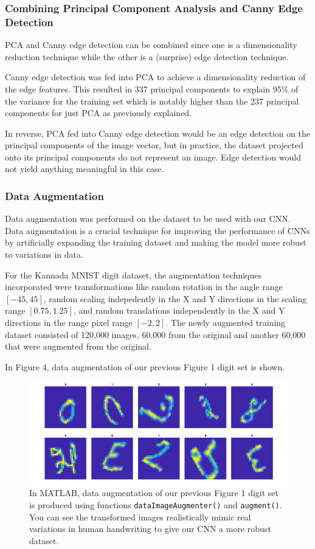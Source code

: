 \documentclass{article}
\begin{document}
\subsubsection{Combining Principal Component Analysis and Canny Edge Detection}

PCA and Canny edge detection can be combined since one is a dimensionality
reduction technique while the other is a (surprise) edge detection technique.

Canny edge detection was fed into PCA to achieve a dimensionality reduction of
the edge features. This resulted in 337 principal components to explain 95\% of
the variance for the training set which is notably higher than the 237 principal
components for just PCA as previously explained.


In reverse, PCA fed into Canny edge detection would be an edge detection on the
principal components of the image vector, but in practice, the dataset projected
onto its principal components do not represent an image. Edge detection would
not yield anything meaningful in this case.

\subsubsection{Data Augmentation}

Data augmentation was performed on the dataset to be used with our CNN. Data
augmentation is a crucial technique for improving the performance of CNNs by
artificially expanding the training dataset and making the model more robust to
variations in data.

For the Kannada MNIST digit dataset, the augmentation techniques incorporated
were transformations like random rotation in the angle range \([-45, 45]\),
random scaling indepedently in the X and Y directions in the scaling range
\([0.75,1.25]\), and random translations independently in the X and Y directions
in the range pixel range \([-2,2]\). The newly augmented training dataset
consisted of 120,000 images, 60,000 from the original and another 60,000 that
were augmented from the original.

In Figure 4, data augmentation of our previous Figure 1 digit set is shown.

\begin{figure}
  \centering
  \includegraphics[width=0.65\linewidth]{aug1.png}
  \caption{In MATLAB, data augmentation of our previous Figure 1 digit set is
    produced using functions \texttt{dataImageAugmenter()} and
    \texttt{augment()}. You can see the transformed images realistically mimic
    real variations in human handwriting to give our CNN a more robust dataset.}
\end{figure}
\end{document}
